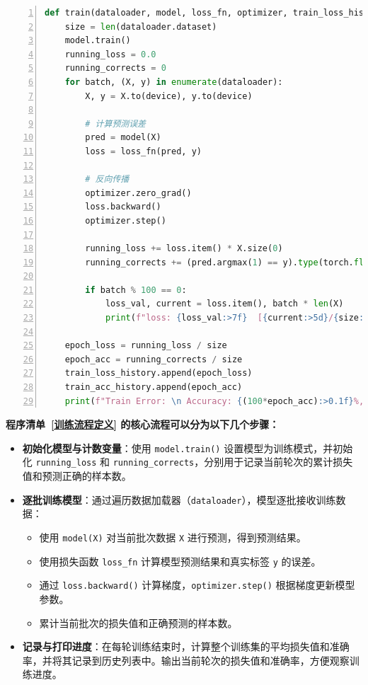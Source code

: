 \begin{lstlisting}[language={python},label={训练流程定义},caption={训练流程定义}, basicstyle=\footnotesize\ttfamily, breaklines=true, numbers=left, frame=single,keepspaces=true,showstringspaces=false]
def train(dataloader, model, loss_fn, optimizer, train_loss_history, train_acc_history):
    size = len(dataloader.dataset)
    model.train()
    running_loss = 0.0
    running_corrects = 0
    for batch, (X, y) in enumerate(dataloader):
        X, y = X.to(device), y.to(device)

        # 计算预测误差
        pred = model(X)
        loss = loss_fn(pred, y)

        # 反向传播
        optimizer.zero_grad()
        loss.backward()
        optimizer.step()

        running_loss += loss.item() * X.size(0)
        running_corrects += (pred.argmax(1) == y).type(torch.float).sum().item()

        if batch % 100 == 0:
            loss_val, current = loss.item(), batch * len(X)
            print(f"loss: {loss_val:>7f}  [{current:>5d}/{size:>5d}]")
    
    epoch_loss = running_loss / size
    epoch_acc = running_corrects / size
    train_loss_history.append(epoch_loss)
    train_acc_history.append(epoch_acc)
    print(f"Train Error: \n Accuracy: {(100*epoch_acc):>0.1f}%, Avg loss: {epoch_loss:>8f} \n")
\end{lstlisting}
\textbf{程序清单~\ref{训练流程定义} 的核心流程可以分为以下几个步骤：}
\begin{itemize}
    \item \textbf{初始化模型与计数变量}：使用 \texttt{model.train()} 设置模型为训练模式，并初始化 \texttt{running\_loss} 和 \texttt{running\_corrects}，分别用于记录当前轮次的累计损失值和预测正确的样本数。
    \item \textbf{逐批训练模型}：通过遍历数据加载器（\texttt{dataloader}），模型逐批接收训练数据：
    \begin{itemize}
        \item 使用 \texttt{model(X)} 对当前批次数据 \texttt{X} 进行预测，得到预测结果。
        \item 使用损失函数 \texttt{loss\_fn} 计算模型预测结果和真实标签 \texttt{y} 的误差。
        \item 通过 \texttt{loss.backward()} 计算梯度，\texttt{optimizer.step()} 根据梯度更新模型参数。
        \item 累计当前批次的损失值和正确预测的样本数。
    \end{itemize}
    \item \textbf{记录与打印进度}：在每轮训练结束时，计算整个训练集的平均损失值和准确率，并将其记录到历史列表中。输出当前轮次的损失值和准确率，方便观察训练进度。
\end{itemize}

